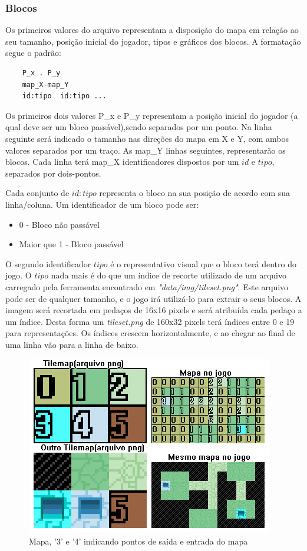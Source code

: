 \subsubsection{Blocos}
Os primeiros valores do arquivo representam a disposição do mapa em relação ao seu tamanho, posição inicial do jogador, tipos e gráficos dos blocos.
A formatação segue o padrão:
\begin{verbatim}
	P_x . P_y
	map_X-map_Y
	id:tipo  id:tipo ...
\end{verbatim}
	
Os primeiros dois valores P\_x e P\_y representam a posição inicial do jogador (a qual deve ser um bloco passável),sendo separados por um ponto.
Na linha seguinte será indicado o tamanho nas direções do mapa em X e Y, com ambos valores separados por um traço.
As map\_Y linhas seguintes, representarão os blocos. Cada linha terá map\_X identificadores dispostos por um $id$ e $tipo$, separados por dois-pontos. 

Cada conjunto de $id:tipo$ representa o bloco na sua posição de acordo com sua linha/coluna.
Um identificador de um bloco pode ser: 

	\begin{itemize}
		\item 0 - Bloco não passável
		\item Maior que 1 - Bloco passável
	\end{itemize}

O segundo identificador $tipo$ é o representativo visual que o bloco terá dentro do jogo. O $tipo$ nada mais é do que um índice de recorte utilizado de um arquivo carregado pela ferramenta encontrado em \textit{"data/img/tileset.png"}. Este arquivo pode ser de qualquer tamanho, e o jogo irá utilizá-lo para extrair o seus blocos. A imagem será recortada em pedaços de 16x16 pixels e será atribuída cada pedaço a um índice. Desta forma um \textit{tileset.png} de 160x32 pixels terá índices entre 0 e 19 para representações. Os índices crescem horizontalmente, e ao chegar ao final de uma linha  vão para a linha de baixo.  

\begin{figure}[h]
	\centering
	\label{fig08}
		\includegraphics[keepaspectratio=true,scale=0.5]{figuras/fig08-map.png}
	\caption{Mapa, '3' e '4' indicando pontos de saída e entrada do mapa}
\end{figure}

